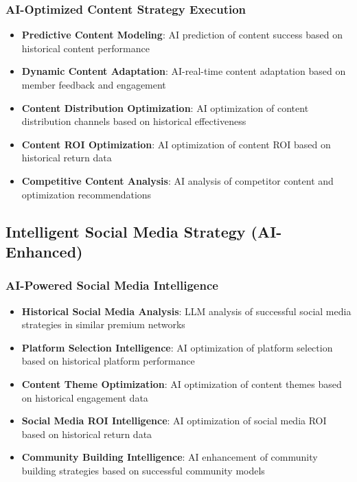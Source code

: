 \subsubsection{AI-Optimized Content Strategy Execution}

\begin{itemize}
    \item \textbf{Predictive Content Modeling}: AI prediction of content success based on historical content performance
    \item \textbf{Dynamic Content Adaptation}: AI-real-time content adaptation based on member feedback and engagement
    \item \textbf{Content Distribution Optimization}: AI optimization of content distribution channels based on historical effectiveness
    \item \textbf{Content ROI Optimization}: AI optimization of content ROI based on historical return data
    \item \textbf{Competitive Content Analysis}: AI analysis of competitor content and optimization recommendations
\end{itemize}

\subsection{Intelligent Social Media Strategy (AI-Enhanced)}

\subsubsection{AI-Powered Social Media Intelligence}

\begin{itemize}
    \item \textbf{Historical Social Media Analysis}: LLM analysis of successful social media strategies in similar premium networks
    \item \textbf{Platform Selection Intelligence}: AI optimization of platform selection based on historical platform performance
    \item \textbf{Content Theme Optimization}: AI optimization of content themes based on historical engagement data
    \item \textbf{Social Media ROI Intelligence}: AI optimization of social media ROI based on historical return data
    \item \textbf{Community Building Intelligence}: AI enhancement of community building strategies based on successful community models
\end{itemize}

